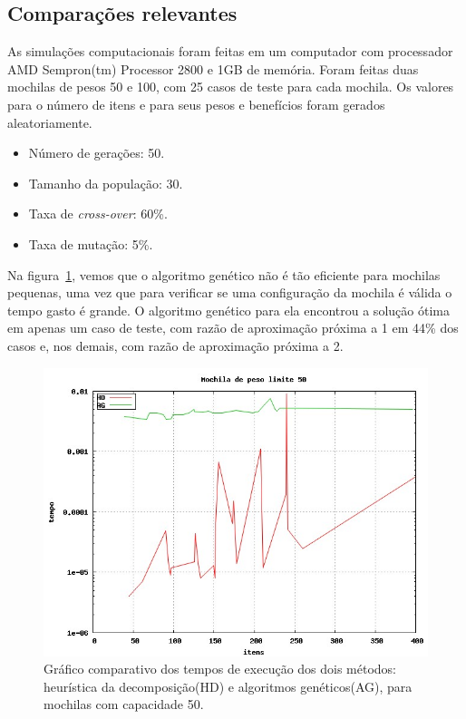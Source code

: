 \subsection{Comparações relevantes}
As simulações computacionais foram feitas em um computador com processador AMD Sempron(tm) Processor 2800 e 1GB de memória. Foram feitas duas mochilas de pesos 50 e 100, com 25 casos de teste para cada mochila. Os valores para o número de itens e para seus pesos e benefícios foram gerados aleatoriamente.

\begin{itemize}
	\item Número de gerações: 50.
	\item Tamanho da população: 30.
	\item Taxa de \textit{cross-over}: 60\%.
	\item Taxa de mutação: 5\%.
\end{itemize}

Na figura~\ref{fig:com_w50}, vemos que o algoritmo genético não é tão eficiente para mochilas pequenas, uma vez que para verificar se uma configuração da mochila é válida o tempo gasto é grande. O algoritmo genético para ela encontrou a solução ótima em apenas um caso de teste, com razão de aproximação próxima a 1 em 44\% dos casos e, nos demais, com razão de aproximação próxima a 2. 

\begin{figure}[htp]
	\centering
	\includegraphics[scale=0.4]{images/com_w50.jpg}
	\caption{Gráfico comparativo dos tempos de execução dos dois métodos: heurística da decomposição(HD) e algoritmos genéticos(AG), para mochilas com capacidade 50.}
	\label{fig:com_w50}
\end{figure}

